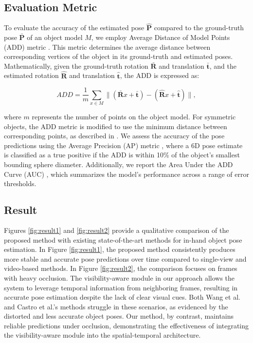 \subsection{Evaluation Metric}
\label{sec:metric}

To evaluate the accuracy of the estimated pose \(\mathbf{\hat{P}}\) compared to the ground-truth pose \(\mathbf{\bar{P}}\) of an object model \(M\), we employ Average Distance of Model Points (ADD) metric \cite{hinterstoisser2012model}. This metric determines the average distance between corresponding vertices of the object in its ground-truth and estimated poses. Mathematically, given the ground-truth rotation \(\mathbf{\bar{R}}\) and translation \(\mathbf{\bar{t}}\), and the estimated rotation \(\mathbf{\hat{R}}\) and translation \(\mathbf{\hat{t}}\), the ADD is expressed as:

\begin{equation}
ADD = \frac{1}{m} \sum_{x \in M} \parallel (\mathbf{\bar{R}}x + \mathbf{\bar{t}}) - (\mathbf{\hat{R}}x + \mathbf{\hat{t}}) \parallel,
\end{equation}

\noindent where \(m\) represents the number of points on the object model. For symmetric objects, the ADD metric is modified to use the minimum distance between corresponding points, as described in \cite{bregier2017symmetry}. We assess the accuracy of the pose predictions using the Average Precision (AP) metric \cite{bregier2017symmetry}, where a 6D pose estimate is classified as a true positive if the ADD is within 10\% of the object's smallest bounding sphere diameter. Additionally, we report the Area Under the ADD Curve (AUC) \cite{wang2019densefusion}, which summarizes the model's performance across a range of error thresholds.

\subsection{Result}

Figures \ref{fig:result1} and \ref{fig:result2} provide a qualitative comparison of the proposed method with existing state-of-the-art methods for in-hand object pose estimation. In Figure \ref{fig:result1}, the proposed method consistently produces more stable and accurate pose predictions over time compared to single-view and video-based methods. In Figure \ref{fig:result2}, the comparison focuses on frames with heavy occlusion. The visibility-aware module in our approach allows the system to leverage temporal information from neighboring frames, resulting in accurate pose estimation despite the lack of clear visual cues. Both Wang et al. and Castro et al.'s methods struggle in these scenarios, as evidenced by the distorted and less accurate object poses. Our method, by contrast, maintains reliable predictions under occlusion, demonstrating the effectiveness of integrating the visibility-aware module into the spatial-temporal architecture.

